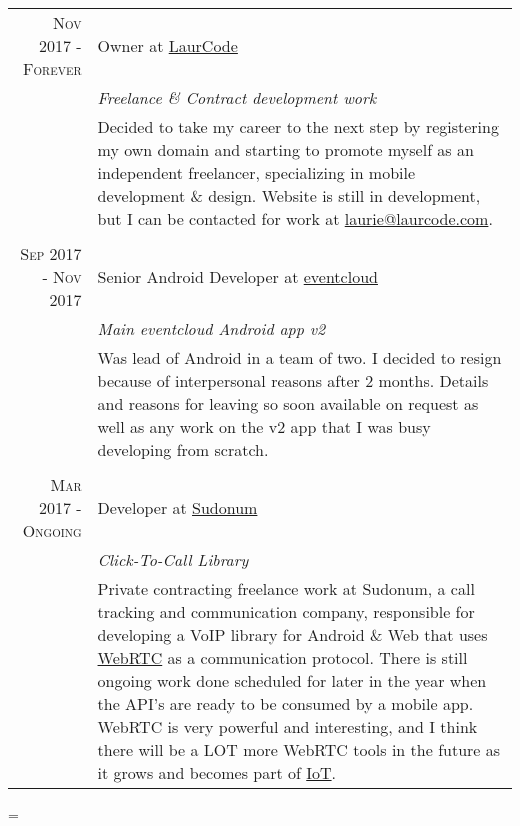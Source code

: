 \documentclass[a4paper,10pt,notitlepage]{article}
\newenvironment{absolutelynopagebreak}
  {\par\nobreak\vfil\penalty0\vfilneg
   \vtop\bgroup}
  {\par\xdef\tpd{\the\prevdepth}\egroup
   \prevdepth=\tpd}
\begin{document}
\begin{absolutelynopagebreak}
\begin{tabular}{r|p{11cm}}
		\textsc{Nov 2017 - Forever}  & Owner at \href{www.laurcode.com}{LaurCode}
		\\&\emph{Freelance \& Contract development work}\\&\footnotesize{Decided to take my career to the next step by registering my own domain and starting to promote myself as an independent freelancer, specializing in mobile development \& design. Website is still in development, but I can be contacted for work at \href{mailto:laurie@laurcode.com}{laurie@laurcode.com}.} \\
		
		\multicolumn{2}{c}{} \\
		
		\textsc{Sep 2017 - Nov 2017} & Senior Android Developer at \href{www.eventcloud.co}{eventcloud}
		\\&\emph{Main eventcloud Android app v2}\\&\footnotesize{Was lead of Android in a team of two. I decided to resign because of interpersonal reasons after 2 months. Details and reasons for leaving so soon available on request as well as any work on the v2 app that I was busy developing from scratch.} \\
		
		\multicolumn{2}{c}{} \\
		
		\textsc{Mar 2017 - Ongoing}  & Developer at \href{www.sudonum.com}{Sudonum}
		\\&\emph{Click-To-Call Library}\\&\footnotesize{Private contracting freelance work at Sudonum, a call tracking and communication company, responsible for developing a VoIP library for Android \& Web that uses \href{https://en.wikipedia.org/wiki/WebRTC}{WebRTC} as a communication protocol. There is still ongoing work done scheduled for later in the year when the API's are ready to be consumed by a mobile app. WebRTC is very powerful and interesting, and I think there will be a LOT more WebRTC tools in the future as it grows and becomes part of
		\href{https://en.wikipedia.org/wiki/Internet_of_things}{IoT}.} \\
		

\end{tabular}
\end{absolutelynopagebreak}
\end{document}
